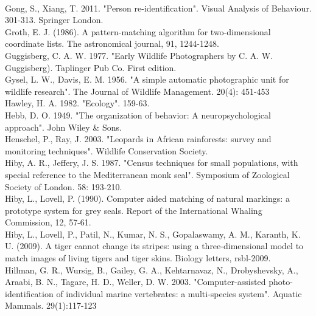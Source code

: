 \documentclass[11pt]{article}
\begin{document}
\\
Gong, S., Xiang, T. 2011. "Person re-identification". Visual Analysis of Behaviour. 301-313. Springer London.
\newline
\\
Groth, E. J. (1986). A pattern-matching algorithm for two-dimensional coordinate lists. The astronomical journal, 91, 1244-1248.
\newline
\\
Guggisberg, C. A. W. 1977. "Early Wildlife Photographers by C. A. W. Guggisberg). Taplinger Pub Co. First edition.
\newline
\\
Gysel, L. W., Davis, E. M. 1956. "A simple automatic photographic unit for wildlife research". The Journal of Wildlife Management. 20(4): 451-453
\newline
\\
Hawley, H. A. 1982. "Ecology". 159-63.
\newline
\\
Hebb, D. O. 1949. "The organization of behavior: A neuropsychological approach". John Wiley \& Sons. 
\newline
\\
Henschel, P., Ray, J. 2003. "Leopards in African rainforests: survey and monitoring techniques". Wildlife Conservation Society.
\newline
\\
Hiby, A. R., Jeffery, J. S. 1987. "Census techniques for small populations, with special reference to the Mediterranean monk seal". Symposium of Zoological Society of London. 58: 193-210.
\newline
\\
Hiby, L., Lovell, P. (1990). Computer aided matching of natural markings: a prototype system for grey seals. Report of the International Whaling Commission, 12, 57-61.
\newline
\\
Hiby, L., Lovell, P., Patil, N., Kumar, N. S., Gopalaswamy, A. M., Karanth, K. U. (2009). A tiger cannot change its stripes: using a three-dimensional model to match images of living tigers and tiger skins. Biology letters, rsbl-2009.
\newline
\\
Hillman, G. R., Wursig, B., Gailey, G. A., Kehtarnavaz, N., Drobyshevsky, A., Araabi, B. N., Tagare, H. D., Weller, D. W. 2003. "Computer-assisted photo-identification of individual marine vertebrates: a multi-species system". Aquatic Mammals. 29(1):117-123
\newline
\end{document}
